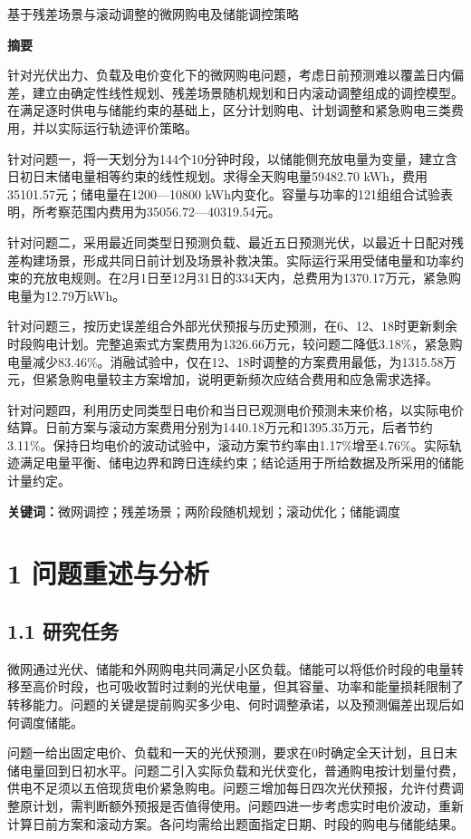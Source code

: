 \documentclass[UTF8,a4paper,zihao=-4,fontset=windows]{ctexart}
\begin{document}
\thispagestyle{empty}\begin{center}{\heiti 基于残差场景与滚动调整的微网购电及储能调控策略}\end{center}
\begin{center}\large\bfseries 摘\quad 要\end{center}
针对光伏出力、负载及电价变化下的微网购电问题，考虑日前预测难以覆盖日内偏差，建立由确定性线性规划、残差场景随机规划和日内滚动调整组成的调控模型。在满足逐时供电与储能约束的基础上，区分计划购电、计划调整和紧急购电三类费用，并以实际运行轨迹评价策略。
\par
针对问题一，将一天划分为144个10分钟时段，以储能侧充放电量为变量，建立含日初日末储电量相等约束的线性规划。求得全天购电量59482.70 kWh，费用35101.57元；储电量在1200—10800 kWh内变化。容量与功率的121组组合试验表明，所考察范围内费用为35056.72—40319.54元。
\par
针对问题二，采用最近同类型日预测负载、最近五日预测光伏，以最近十日配对残差构建场景，形成共同日前计划及场景补救决策。实际运行采用受储电量和功率约束的充放电规则。在2月1日至12月31日的334天内，总费用为1370.17万元，紧急购电量为12.79万kWh。
\par
针对问题三，按历史误差组合外部光伏预报与历史预测，在6、12、18时更新剩余时段购电计划。完整追索式方案费用为1326.66万元，较问题二降低3.18\%，紧急购电量减少83.46\%。消融试验中，仅在12、18时调整的方案费用最低，为1315.58万元，但紧急购电量较主方案增加，说明更新频次应结合费用和应急需求选择。
\par
针对问题四，利用历史同类型日电价和当日已观测电价预测未来价格，以实际电价结算。日前方案与滚动方案费用分别为1440.18万元和1395.35万元，后者节约3.11\%。保持日均电价的波动试验中，滚动方案节约率由1.17\%增至4.76\%。实际轨迹满足电量平衡、储电边界和跨日连续约束；结论适用于所给数据及所采用的储能计量约定。
\par
\textbf{关键词：}微网调控；残差场景；两阶段随机规划；滚动优化；储能调度
\par
\clearpage\setcounter{page}{1}
\section{1 问题重述与分析}
\subsection{1.1 研究任务}
微网通过光伏、储能和外网购电共同满足小区负载。储能可以将低价时段的电量转移至高价时段，也可吸收暂时过剩的光伏电量，但其容量、功率和能量损耗限制了转移能力。问题的关键是提前购买多少电、何时调整承诺，以及预测偏差出现后如何调度储能。
\par
问题一给出固定电价、负载和一天的光伏预测，要求在0时确定全天计划，且日末储电量回到日初水平。问题二引入实际负载和光伏变化，普通购电按计划量付费，供电不足须以五倍现货电价紧急购电。问题三增加每日四次光伏预报，允许付费调整原计划，需判断额外预报是否值得使用。问题四进一步考虑实时电价波动，重新计算日前方案和滚动方案。各问均需给出题面指定日期、时段的购电与储能结果。
\par
\end{document}
